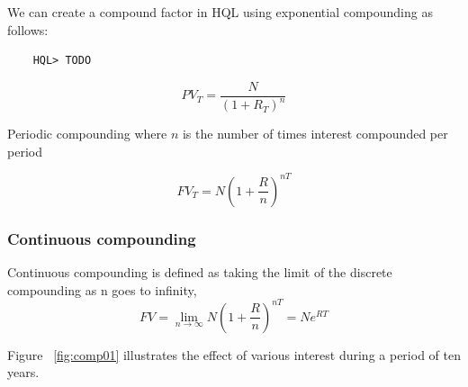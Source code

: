 \documentclass[11pt,a4paper]{article}
\numberwithin{equation}{section}
\begin{document}
	We can create a compound factor in HQL using  exponential compounding as follows:

	\FrameSep
	\begin{lstlisting}
	HQL> TODO
	\end{lstlisting}
	\FrameSep

	\[ PV_T = \frac{N}{(1+R_T)^n} \]

	Periodic compounding where $n$ is the number of times interest compounded per period

	\[
	FV_T=N\left( 1 + \frac{R}{n}  \right)^{nT}
	\]

	\subsubsection{Continuous compounding}
	Continuous compounding is defined as taking the limit of the discrete compounding as n goes to infinity,
	\[
	FV=\lim_{n \to \infty} N \left(1+\frac{R}{n}\right)^{nT}=Ne^{RT}
	\]




	Figure ~\ref{fig:comp01} illustrates the effect of various interest during a period of ten years.
\end{document}
